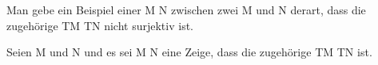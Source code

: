 {}
{





Man gebe ein Beispiel einer
\maabbdisp {\varphi} { M } { N
} {}
zwischen zwei
\mathkor {} {M} {und} {N} {}
derart, dass die zugehörige
 {TM} {TN
} {}
nicht surjektiv ist.





}
{} {}

{}
{





Seien
\mathkor {} {M} {und} {N} {}
 und es sei
\maabb {\varphi} { M } { N
} {} eine
 Zeige, dass die zugehörige
 {TM} {TN
} {}
ist.





}
{} {}
